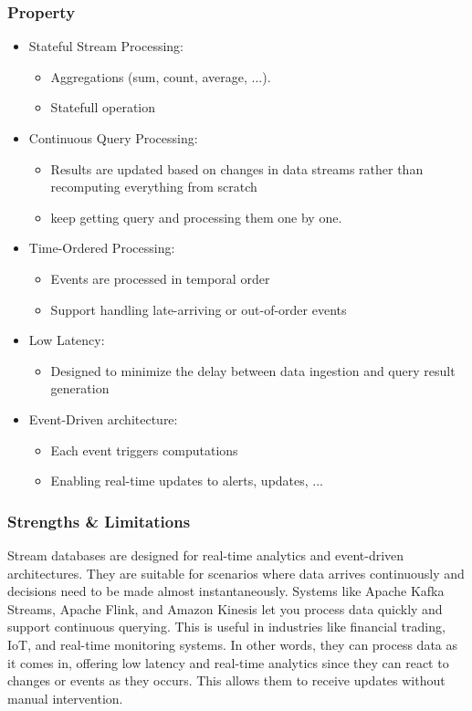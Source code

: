 \documentclass[utf8,9pt]{extarticle}
\begin{document}
\subsubsection{Property}
\begin{itemize}
    \item Stateful Stream Processing:
        \begin{itemize}
        \item Aggregations (sum, count, average, ...).
        \item Statefull operation 
        \end{itemize}
    \item Continuous Query Processing:
        \begin{itemize}
        \item Results are updated based on changes in data streams rather than recomputing everything from scratch
        \item keep getting query and processing them one by one.
        \end{itemize}
    \item  Time-Ordered Processing:
        \begin{itemize}
        \item Events are processed in temporal order
        \item Support handling late-arriving or out-of-order events
        \end{itemize}
    \item  Low Latency:
        \begin{itemize}
        \item Designed to minimize the delay between data ingestion and query result generation
        \end{itemize}
    \item Event-Driven architecture:
        \begin{itemize}
        \item Each event triggers computations
        \item Enabling real-time updates to alerts, updates, ...
        \end{itemize}
\end{itemize}

\subsubsection{Strengths \& Limitations}
\hspace{2mm} Stream databases are designed for real-time analytics and event-driven architectures. They are suitable for scenarios where data arrives continuously and decisions need to be made almost instantaneously. Systems like Apache Kafka Streams, Apache Flink, and Amazon Kinesis let you process data quickly and support continuous querying. This is useful in industries like financial trading, IoT, and real-time monitoring systems. In other words, they can process data as it comes in, offering low latency and real-time analytics since they can react to changes or events as they occurs. This allows them to receive updates without manual intervention. 
\end{document}
